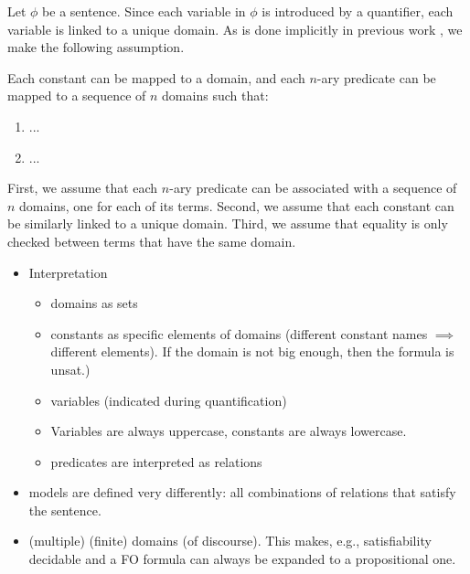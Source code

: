 Let $\phi$ be a sentence. Since each variable in $\phi$ is introduced by a
quantifier, each variable is linked to a unique domain. As is done implicitly in
previous work \citep{DBLP:phd/basesearch/VandenBroeck13}, we make the following
assumption.

\begin{assumption}
  Each constant can be mapped to a domain, and each $n$-ary predicate can be
  mapped to a sequence of $n$ domains such that:
  \begin{enumerate}
    \item ...
    \item ...
  \end{enumerate}
\end{assumption}

First, we assume that each $n$-ary predicate can be associated with a sequence
of $n$ domains, one for each of its terms. Second, we assume that each constant
can be similarly linked to a unique domain. Third, we assume that equality is
only checked between terms that have the same domain.


\begin{itemize}
  \item Interpretation
        \begin{itemize}
          \item domains as sets
          \item constants as specific elements of domains (different constant
                names $\implies$ different elements). If the domain is not big
                enough, then the formula is unsat.)
          \item variables (indicated during quantification)
          \item Variables are always uppercase, constants are always lowercase.
          \item predicates are interpreted as relations
        \end{itemize}
  \item models are defined very differently: all combinations of relations that
        satisfy the sentence.
  \item (multiple) (finite) domains (of discourse). This makes, e.g.,
        satisfiability decidable and a FO formula can always be expanded to a
        propositional one.
\end{itemize}

